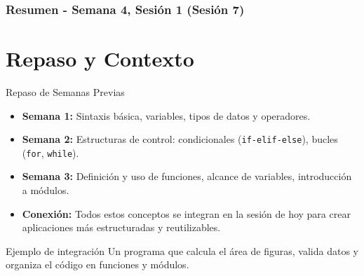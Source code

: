 \documentclass[10pt]{beamer}
\begin{document}
\myfront{}

\begin{frame}
  \titlepage
\end{frame}

\begin{frame}
  \frametitle{Resumen - Semana 4, Sesión 1 (Sesión 7)}
  \tableofcontents
\end{frame}


\section{Repaso y Contexto}


\begin{frame}{Repaso de Semanas Previas}
  \begin{itemize}
    \item \textbf{Semana 1:} Sintaxis básica, variables, tipos de datos y operadores.
    \item \textbf{Semana 2:} Estructuras de control: condicionales (\texttt{if-elif-else}), bucles (\texttt{for}, \texttt{while}).
    \item \textbf{Semana 3:} Definición y uso de funciones, alcance de variables, introducción a módulos.
    \item \textbf{Conexión:} Todos estos conceptos se integran en la sesión de hoy para crear aplicaciones más estructuradas y reutilizables.
  \end{itemize}
  \begin{block}{Ejemplo de integración}
    Un programa que calcula el área de figuras, valida datos y organiza el código en funciones y módulos.
  \end{block}
\end{frame}
\end{document}
